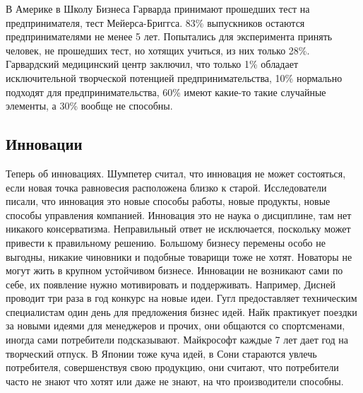 \documentclass[a4paper, 12pt]{article}
\begin{document}
В Америке в Школу Бизнеса Гарварда принимают прошедших тест на предпринимателя, тест Мейерса-Бриггса. 83\% выпускников остаются предпринимателями не менее 5 лет. Попытались для эксперимента принять человек, не прошедших тест, но хотящих учиться, из них только 28\%. Гарвардский медицинский центр заключил, что только 1\% обладает исключительной творческой потенцией предпринимательства, 10\% нормально подходят для предпринимательства, 60\% имеют какие-то такие случайные элементы, а 30\% вообще не способны. 

\subsection{Инновации}

Теперь об инновациях. Шумпетер считал, что инновация не может состояться, если новая точка равновесия расположена близко к старой. Исследователи писали, что инновация это новые способы работы, новые продукты, новые способы управления компанией. Инновация это не наука о дисциплине, там нет никакого консерватизма. Неправильный ответ не исключается, поскольку может привести к правильному решению. Большому бизнесу перемены особо не выгодны, никакие чиновники и подобные товарищи тоже не хотят. Новаторы не могут жить в крупном устойчивом бизнесе. Инновации не возникают сами по себе, их появление нужно мотивировать и поддерживать. Например, Дисней проводит три раза в год конкурс на новые идеи. Гугл предоставляет техническим специалистам один день для предложения бизнес идей. Найк практикует поездки за новыми идеями для менеджеров и прочих, они общаются со спортсменами, иногда сами потребители подсказывают. Майкрософт каждые 7 лет дает год на творческий отпуск. В Японии тоже куча идей, в Сони стараются увлечь потребителя, совершенствуя свою продукцию, они считают, что потребители часто не знают что хотят или даже не знают, на что производители способны. 
\end{document}
